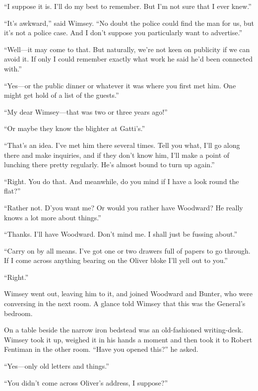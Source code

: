 \enquote{I suppose it is. I'll do my best to remember. But I'm not sure that I ever knew.}

\enquote{It's awkward,} said Wimsey. \enquote{No doubt the police could find the man for us, but it's not a police case. And I don't suppose you particularly want to advertise.}

\enquote{Well\allowbreak---\allowbreak it may come to that. But naturally, we're not keen on publicity if we can avoid it. If only I could remember exactly what work he said he'd been connected with.}

\enquote{Yes\allowbreak---\allowbreak or the public dinner or whatever it was where you first met him. One might get hold of a list of the guests.}

\enquote{My dear Wimsey\allowbreak---\allowbreak that was two or three years ago!}

\enquote{Or maybe they know the blighter at Gatti's.}

\enquote{That's an idea. I've met him there several times. Tell you what, I'll go along there and make inquiries, and if they don't know him, I'll make a point of lunching there pretty regularly. He's almost bound to turn up again.}

\enquote{Right. You do that. And meanwhile, do you mind if I have a look round the flat?}

\enquote{Rather not. D'you want me? Or would you rather have Woodward? He really knows a lot more about things.}

\enquote{Thanks. I'll have Woodward. Don't mind me. I shall just be fussing about.}

\enquote{Carry on by all means. I've got one or two drawers full of papers to go through. If I come across anything bearing on the Oliver bloke I'll yell out to you.}

\enquote{Right.}

Wimsey went out, leaving him to it, and joined Woodward and Bunter, who were conversing in the next room. A glance told Wimsey that this was the General's bedroom.

On a table beside the narrow iron bedstead was an old-fashioned writing-desk. Wimsey took it up, weighed it in his hands a moment and then took it to Robert Fentiman in the other room. \enquote{Have you opened this?} he asked.

\enquote{Yes\allowbreak---\allowbreak only old letters and things.}

\enquote{You didn't come across Oliver's address, I suppose?}

